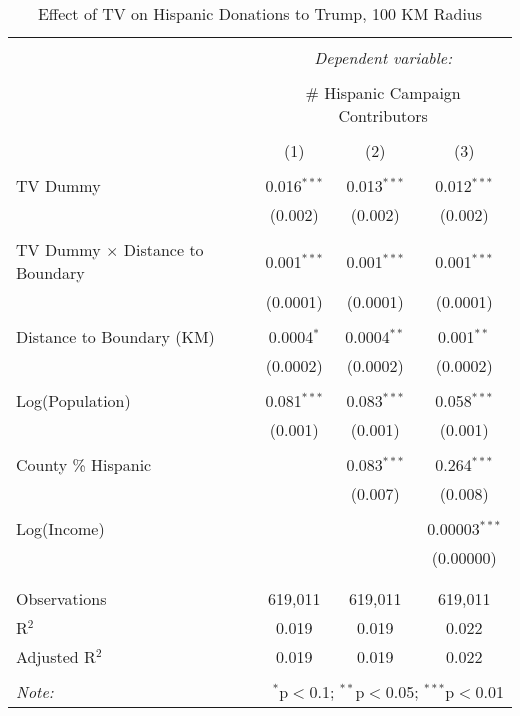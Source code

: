 
\begin{table}[!htbp] \centering 
  \caption{Effect of TV on Hispanic Donations to Trump, 100 KM Radius} 
  \label{} 
\begin{tabular}{@{\extracolsep{-5pt}}lccc} 
\\[-1.8ex]\hline 
\hline \\[-1.8ex] 
 & \multicolumn{3}{c}{\textit{Dependent variable:}} \\ 
\cline{2-4} 
\\[-1.8ex] & \multicolumn{3}{c}{\# Hispanic Campaign Contributors} \\ 
\\[-1.8ex] & (1) & (2) & (3)\\ 
\hline \\[-1.8ex] 
 TV Dummy & 0.016$^{***}$ & 0.013$^{***}$ & 0.012$^{***}$ \\ 
  & (0.002) & (0.002) & (0.002) \\ 
  & & & \\ 
 TV Dummy $\times$ Distance to Boundary  & 0.001$^{***}$ & 0.001$^{***}$ & 0.001$^{***}$ \\ 
  & (0.0001) & (0.0001) & (0.0001) \\ 
  & & & \\ 
 Distance to Boundary (KM) & 0.0004$^{*}$ & 0.0004$^{**}$ & 0.001$^{**}$ \\ 
  & (0.0002) & (0.0002) & (0.0002) \\ 
  & & & \\ 
 Log(Population) & 0.081$^{***}$ & 0.083$^{***}$ & 0.058$^{***}$ \\ 
  & (0.001) & (0.001) & (0.001) \\ 
  & & & \\ 
 County \% Hispanic &  & 0.083$^{***}$ & 0.264$^{***}$ \\ 
  &  & (0.007) & (0.008) \\ 
  & & & \\ 
 Log(Income) &  &  & 0.00003$^{***}$ \\ 
  &  &  & (0.00000) \\ 
  & & & \\ 
\hline \\[-1.8ex] 
Observations & 619,011 & 619,011 & 619,011 \\ 
R$^{2}$ & 0.019 & 0.019 & 0.022 \\ 
Adjusted R$^{2}$ & 0.019 & 0.019 & 0.022 \\ 
\hline 
\hline \\[-1.8ex] 
\textit{Note:}  & \multicolumn{3}{r}{$^{*}$p$<$0.1; $^{**}$p$<$0.05; $^{***}$p$<$0.01} \\ 
\end{tabular} 
\end{table} 
